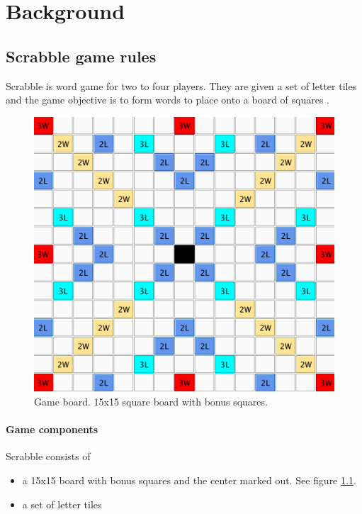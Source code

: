 \documentclass[a4paper, 12pt]{report}
\begin{document}
\chapter{Background}

\section{Scrabble game rules}
\label{sec:rules}
Scrabble is word game for two to four players. They are given a set of letter tiles and the game objective is to form words to place onto a board of squares \cite{ABSP} \cite{NASPA} \cite{forbund}.

\begin{figure}[h]
\centering
\includegraphics[scale=0.55]{board}
\caption {Game board. 15x15 square board with bonus squares.}
\label{fig:game-board}
\end{figure}

\subsubsection{Game components}
Scrabble consists of 

\begin{itemize}
\item a 15x15 board with bonus squares and the center marked out. See figure \ref{fig:game-board}.
\item a set of letter tiles
\end{itemize}
\end{document}

